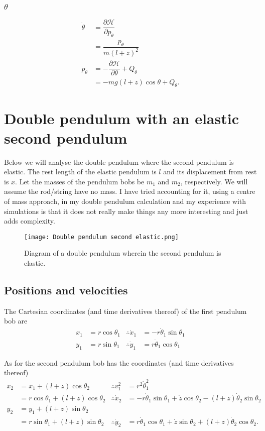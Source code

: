 \documentclass[12pt,a4paper,portrait]{article}
\newcommand{\ham}{\mathcal{H}}
\begin{document}
\subsubsection{$\theta$}
\begin{align*}
	\dot{\theta} &= \dfrac{\partial \ham}{\partial p_{\theta}} \\
	&= \dfrac{p_{\theta}}{m(l+z)^2} \\
	\dot{p}_{\theta} &= -\dfrac{\partial \ham}{\partial \theta} + Q_{\theta} \\
	&= -mg(l+z)\cos{\theta} + Q_{\theta}.
\end{align*}

\section{Double pendulum with an elastic second pendulum}
Below we will analyse the double pendulum where the second pendulum is elastic. The rest length of the elastic pendulum is $l$ and its displacement from rest is $x$. Let the masses of the pendulum bobs be $m_1$ and $m_2$, respectively. We will assume the rod/string have no mass. I have tried accounting for it, using a centre of mass approach, in my double pendulum calculation and my experience with simulations is that it does not really make things any more interesting and just adds complexity. 
\begin{figure}[H]
	\texttt{[image: Double pendulum second elastic.png]}
	\caption{Diagram of a double pendulum wherein the second pendulum is elastic.}
\end{figure}

\subsection{Positions and velocities}
The Cartesian coordinates (and time derivatives thereof) of the first pendulum bob are
\begin{align*}
	x_1 &= r \cos{\theta_1} &\therefore \dot{x}_1 &= -r \dot{\theta}_1 \sin{\theta_1}\\
	y_1 &= r \sin{\theta_1} &\therefore \dot{y}_1 &= r \dot{\theta}_1 \cos{\theta_1}
\end{align*}

As for the second pendulum bob has the coordinates (and time derivatives thereof)
\begin{align*}
	x_2 &= x_1 + (l+z)\cos{\theta_2} & \therefore v_1^2 &= r^2 \dot{\theta}_1^2\\
	&= r \cos{\theta_1} + (l+z)\cos{\theta_2} &\therefore \dot{x}_2 &= -r \dot{\theta}_1 \sin{\theta_1} + \dot{z} \cos{\theta_2}-(l+z)\dot{\theta}_2 \sin{\theta_2}\\
	y_2 &= y_1 + (l+z)\sin{\theta_2} \\
	&= r\sin{\theta_1} + (l+z)\sin{\theta_2} &\therefore \dot{y}_2 &= r \dot{\theta}_1 \cos{\theta_1} + \dot{z} \sin{\theta_2}+(l+z)\dot{\theta}_2 \cos{\theta_2}.
\end{align*}
\end{document}
